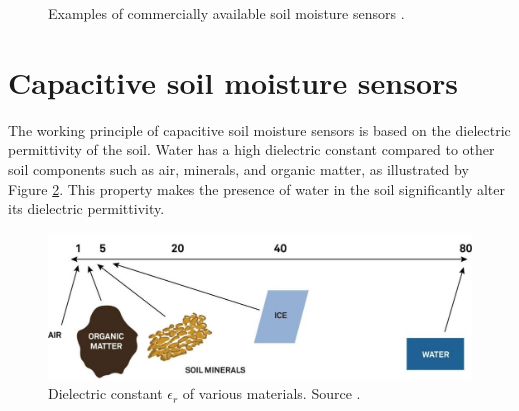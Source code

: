\begin{figure}
    \hfil
    \caption{\label{fig:satellite}Examples of commercially available soil moisture sensors \cite{meter_group_teros_nodate, baseline_soil_2021, czechproject_spol_sro_pudni_2024}.}
\end{figure}

\section{\label{section:soil-moisure-sensors-theory}Capacitive soil moisture sensors}
The working principle of capacitive soil moisture sensors is based on the dielectric permittivity of the soil. Water has a high dielectric constant compared to other soil components such as air, minerals, and organic matter, as illustrated by Figure \ref{fig:dielectric-constant}. This property makes the presence of water in the soil significantly alter its dielectric permittivity.

\begin{figure}
    \includegraphics[width=.7\textwidth]{fig/dielectric-constant.jpg}
    \caption{\label{fig:dielectric-constant}Dielectric constant $\epsilon_r$ of various materials. Source \cite{meter_group_soil_2023}.}
\end{figure}

